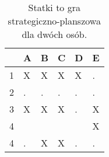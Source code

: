 \begin{table}[htbp]
\centering
\begin{tabular}{|l|l|l|l|l|l|}
\hline
  & A & B & C & D & E \\ \hline
1 & X & X & X & X & . \\ \hline
2 & . & . & . & . & . \\ \hline
3 & X & X & X & . & X \\ \hline
4 &   &   &   &   & X \\ \hline
4 & . & X & X & . & . \\ \hline
\end{tabular}
\caption{Statki to gra strategiczno-planszowa dla dwóch osób.}
\label{tab:statki}
\end{table}